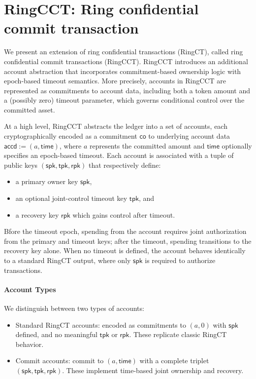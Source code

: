 
\section{RingCCT: Ring confidential commit transaction}
We present an extension of ring confidential transactions (RingCT), called ring confidential commit transactions (RingCCT).
RingCCT introduces an additional account abstraction that incorporates commitment-based ownership logic with epoch-based timeout semantics. More precisely, accounts in RingCCT are represented as commitments to account data, including both a token amount and a (possibly zero) timeout parameter, which governs conditional control over the committed asset.

At a high level, RingCCT abstracts the ledger into a set of accounts, each cryptographically encoded as a commitment $\mathsf{co}$ to underlying account data $\mathsf{accd} := (a, \mathsf{time})$, where $a$ represents the committed amount and $\mathsf{time}$ optionally specifies an epoch-based timeout. Each account is associated with a tuple of public keys $(\mathsf{spk}, \mathsf{tpk}, \mathsf{rpk})$ that respectively define:

\begin{itemize}
	\item a primary owner key $\mathsf{spk}$,

	\item an optional joint-control timeout key $\mathsf{tpk}$, and

	\item a recovery key $\mathsf{rpk}$ which gains control after timeout.
\end{itemize}

Bfore the timeout epoch, spending from the account requires joint authorization from the primary and timeout keys; after the timeout, spending transitions to the recovery key alone. When no timeout is defined, the account behaves identically to a standard RingCT output, where only $\mathsf{spk}$ is required to authorize transactions.

\paragraph*{Account Types} We distinguish between two types of accounts:

\begin{itemize}
	\item Standard RingCT accounts: encoded as commitments to $(a, 0)$ with $\mathsf{spk}$ defined, and no meaningful $\mathsf{tpk}$ or $\mathsf{rpk}$. These replicate classic RingCT behavior.

	\item Commit accounts: commit to $(a, \mathsf{time})$ with a complete triplet $(\mathsf{spk}, \mathsf{tpk}, \mathsf{rpk})$. These implement time-based joint ownership and recovery.
\end{itemize}

